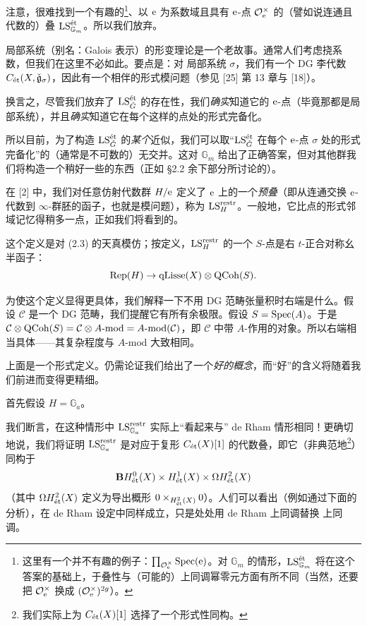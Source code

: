 注意，很难找到一个有趣的\footnote{这里有一个并不有趣的例子：$\prod_{\OO^\times_{\e}} \Spec(\e)$。对 $\mathbb{G}_m$ 的情形，$\LS^{\et}_{\mathbb{G}_m}$ 将在这个答案的基础上，于叠性与（可能的）上同调幂零元方面有所不同（当然，还要把 $\OO^\times_{\e}$ 换成 $(\OO^\times_{\e})^{2g}$）。}、以 $\e$ 为系数域且具有 $\e$-点 $\OO^{\times}_{\e}$ 的（譬如说连通且代数的）叠 $\LS^{\et}_{\mathbb{G}_m}$。所以我们放弃。

 \et{} 局部系统（别名：Galois 表示）的形变理论是一个老故事。通常人们考虑挠系数，但我们在这里不必如此。要点是：对 \et{} 局部系统 $\sigma$，我们有一个 DG 李代数 $C_{\et}(X, \check{\mathfrak{g}}_\sigma)$，因此有一个相伴的形式模问题（参见 [25] 第 13 章与 [18]）。

换言之，尽管我们放弃了 $\LS^{\et}_{\bG}$ 的存在性，我们\emph{确实}知道它的 $\e$-点（毕竟那都是局部系统），并且\emph{确实}知道它在每个这样的点处的形式完备化。

所以目前，为了构造 $\LS^{\et}_{\bG}$ 的\emph{某个}近似，我们可以取“$\LS^{\et}_{\bG}$ 在每个 $\e$-点 $\sigma$ 处的形式完备化”的（通常是不可数的）无交并。这对 $\mathbb{G}_m$ 给出了正确答案，但对其他群我们将构造一个稍好一些的东西（正如 §2.2 余下部分所讨论的）。

 在 [2] 中，我们对任意仿射代数群 $H/\e$ 定义了 $\e$ 上的一个\emph{预叠}（即从连通交换 $\e$-代数到 $\infty$-群胚的函子，也就是模问题），称为 $\LS^{\restr}_{H}$。一般地，它比点的形式邻域记忆得稍多一点，正如我们将看到的。

这个定义是对 (2.3) 的天真模仿；按定义，$\LS^{\restr}_{H}$ 的一个 $S$-点是右 $t$-正合对称幺半函子：
\[
  \Rep(H) \to \qLisse(X) \otimes \QCoh(S).
\]

\begin{remark}
为使这个定义显得更具体，我们解释一下不用 DG 范畴张量积时右端是什么。假设 $\mathcal{C}$ 是一个 DG 范畴，我们提醒它有所有余极限。假设 $S = \Spec(A)$。于是 $\mathcal{C} \otimes \QCoh(S) = \mathcal{C} \otimes A\text{-}\mathrm{mod} = A\text{-}\mathrm{mod}(\mathcal{C})$，即 $\mathcal{C}$ 中带 $A$-作用的对象。所以右端相当具体——其复杂程度与 $A$-$\mathrm{mod}$ 大致相同。
\end{remark}

 上面是一个形式定义。仍需论证我们给出了一个\emph{好的概念}，而“好”的含义将随着我们前进而变得更精细。

 首先假设 $H = \mathbb{G}_a$。

我们断言，在这种情形中 $\LS^{\restr}_{\mathbb{G}_a}$ 实际上“看起来与” de Rham 情形相同！更确切地说，我们将证明 $\LS^{\restr}_{\mathbb{G}_a}$ 是对应于复形 $C_{\et}(X)[1]$ 的代数叠，即它（非典范地\footnote{我们实际上为 $C_{\et}(X)[1]$ 选择了一个形式性同构。}）同构于
\[
  \mathbf{B}H^0_{\et}(X) \times H^1_{\et}(X) \times \Omega H^2_{\et}(X)
\]
（其中 $\Omega H^2_{\et}(X)$ 定义为导出概形 $0 \times_{H^2_{\et}(X)} 0$）。人们可以看出（例如通过下面的分析），在 de Rham 设定中同样成立，只是处处用 de Rham 上同调替换 \et{} 上同调。

